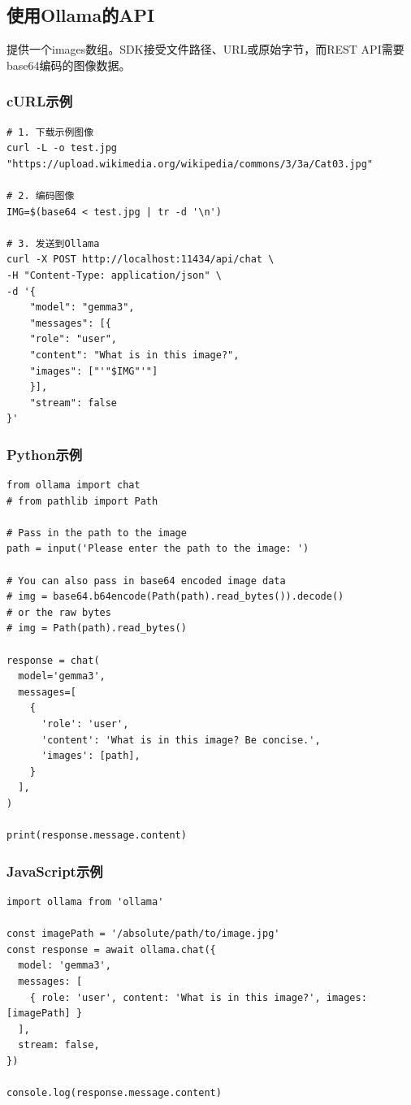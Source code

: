 \documentclass[12pt,UTF8]{ctexbook}
\begin{document}
\subsection{使用Ollama的API}
提供一个images数组。SDK接受文件路径、URL或原始字节，而REST API需要base64编码的图像数据。

\subsubsection{cURL示例}
\begin{verbatim}
# 1. 下载示例图像
curl -L -o test.jpg "https://upload.wikimedia.org/wikipedia/commons/3/3a/Cat03.jpg"

# 2. 编码图像
IMG=$(base64 < test.jpg | tr -d '\n')

# 3. 发送到Ollama
curl -X POST http://localhost:11434/api/chat \
-H "Content-Type: application/json" \
-d '{
    "model": "gemma3",
    "messages": [{
    "role": "user",
    "content": "What is in this image?",
    "images": ["'"$IMG"'"]
    }],
    "stream": false
}'
\end{verbatim}

\subsubsection{Python示例}
\begin{verbatim}
from ollama import chat
# from pathlib import Path

# Pass in the path to the image
path = input('Please enter the path to the image: ')

# You can also pass in base64 encoded image data
# img = base64.b64encode(Path(path).read_bytes()).decode()
# or the raw bytes
# img = Path(path).read_bytes()

response = chat(
  model='gemma3',
  messages=[
    {
      'role': 'user',
      'content': 'What is in this image? Be concise.',
      'images': [path],
    }
  ],
)

print(response.message.content)
\end{verbatim}

\subsubsection{JavaScript示例}
\begin{verbatim}
import ollama from 'ollama'

const imagePath = '/absolute/path/to/image.jpg'
const response = await ollama.chat({
  model: 'gemma3',
  messages: [
    { role: 'user', content: 'What is in this image?', images: [imagePath] }
  ],
  stream: false,
})

console.log(response.message.content)
\end{verbatim}
\end{document}
